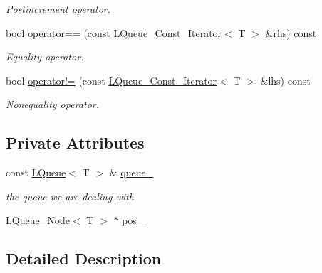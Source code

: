 \begin{DoxyCompactItemize}
\begin{DoxyCompactList}\small\item\em Postincrement operator. \item\end{DoxyCompactList}\item 
bool \hyperlink{classMadara_1_1Utility_1_1LQueue__Const__Iterator_ab0149196495c465bd61ef686bcb479f5}{operator==} (const \hyperlink{classMadara_1_1Utility_1_1LQueue__Const__Iterator}{LQueue\_\-Const\_\-Iterator}$<$ T $>$ \&rhs) const 
\begin{DoxyCompactList}\small\item\em Equality operator. \item\end{DoxyCompactList}\item 
bool \hyperlink{classMadara_1_1Utility_1_1LQueue__Const__Iterator_a70497af2aac7083e5a588d453cb39799}{operator!=} (const \hyperlink{classMadara_1_1Utility_1_1LQueue__Const__Iterator}{LQueue\_\-Const\_\-Iterator}$<$ T $>$ \&lhs) const 
\begin{DoxyCompactList}\small\item\em Nonequality operator. \item\end{DoxyCompactList}\end{DoxyCompactItemize}
\subsection*{Private Attributes}
\begin{DoxyCompactItemize}
\item 
const \hyperlink{classMadara_1_1Utility_1_1LQueue}{LQueue}$<$ T $>$ \& \hyperlink{classMadara_1_1Utility_1_1LQueue__Const__Iterator_a599069946aa94096a5822796e12d283e}{queue\_\-}
\begin{DoxyCompactList}\small\item\em the queue we are dealing with \item\end{DoxyCompactList}\item 
\hyperlink{classMadara_1_1Utility_1_1LQueue__Node}{LQueue\_\-Node}$<$ T $>$ $\ast$ \hyperlink{classMadara_1_1Utility_1_1LQueue__Const__Iterator_a1d93e0046a5e61c5a9a1a36445b12c44}{pos\_\-}
\end{DoxyCompactItemize}


\subsection{Detailed Description}
